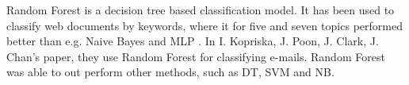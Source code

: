 Random Forest is a decision tree based classification model. It has been used to classify web documents by keywords, where it for five and seven topics performed better than e.g. Naive Bayes and MLP \cite{keywords}. In I. Kopriska, J. Poon, J. Clark, J. Chan's paper, they use Random Forest for classifying e-mails. Random Forest was able to out perform other methods, such as DT, SVM and NB\cite{email}.
